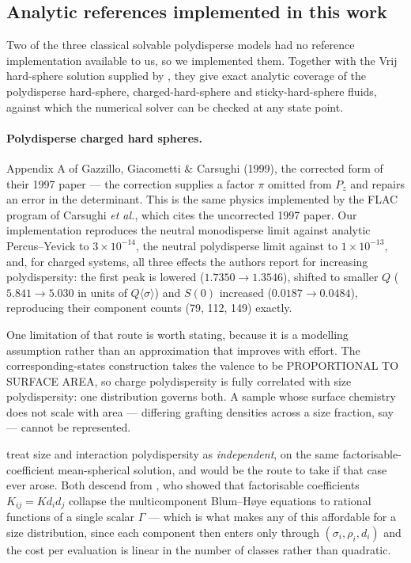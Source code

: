 \subsection{Analytic references implemented in this work}
\label{sec:analyticrefs}

Two of the three classical solvable polydisperse models had no reference
implementation available to us, so we implemented them. Together with the
Vrij hard-sphere solution supplied by , they give exact
analytic coverage of the polydisperse hard-sphere, charged-hard-sphere and
sticky-hard-sphere fluids, against which the numerical solver can be checked
at any state point.

\paragraph{Polydisperse charged hard spheres.}
Appendix A of Gazzillo, Giacometti \& Carsughi (1999), the corrected form of
their 1997 paper --- the correction supplies a factor $\pi$ omitted from
$P_z$ and repairs an error in the determinant. This is the same physics
implemented by the FLAC program of Carsughi \emph{et al.}, which cites the
uncorrected 1997 paper. Our implementation reproduces the neutral
monodisperse limit against analytic Percus--Yevick to $3\times10^{-14}$, the
neutral polydisperse limit against  to $1\times10^{-13}$,
and, for charged systems, all three effects the authors report for increasing
polydispersity: the first peak is lowered ($1.7350\to1.3546$), shifted to
smaller $Q$ ($5.841\to5.030$ in units of $Q\langle\sigma\rangle$) and
$S(0)$ increased ($0.0187\to0.0484$), reproducing their component counts (79,
112, 149) exactly.

One limitation of that route is worth stating, because it is a modelling
assumption rather than an approximation that improves with effort. The
corresponding-states construction takes the valence to be PROPORTIONAL TO
SURFACE AREA, so charge polydispersity is fully correlated with size
polydispersity: one distribution governs both. A sample whose surface
chemistry does not scale with area --- differing grafting densities across a
size fraction, say --- cannot be represented.

\citet{GinozaYasutomi1998} treat size and interaction polydispersity as
\emph{independent}, on the same factorisable-coefficient mean-spherical
solution, and would be the route to take if that case ever arose. Both
descend from \citet{Ginoza1986}, who showed that factorisable coefficients
$K_{ij} = K d_i d_j$ collapse the multicomponent Blum--H\o ye equations to
rational functions of a single scalar $\Gamma$ --- which is what makes any of
this affordable for a size distribution, since each component then enters
only through $(\sigma_i, \rho_i, d_i)$ and the cost per evaluation is linear
in the number of classes rather than quadratic.


